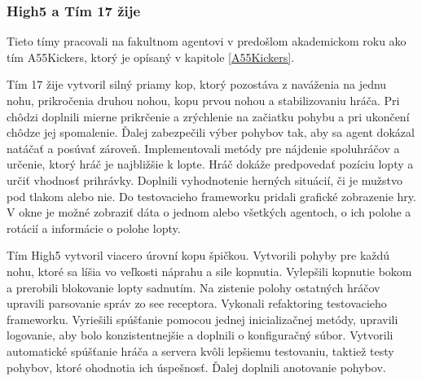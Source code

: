 \subsubsection{High5 a Tím 17 žije}

Tieto tímy pracovali na fakultnom agentovi v predošlom akademickom roku ako tím A55Kickers, ktorý je opísaný v kapitole \ref{A55Kickers}.

Tím 17 žije\cite{tim17zije} vytvoril silný priamy kop, ktorý pozostáva z naváženia na jednu nohu, prikročenia druhou nohou, kopu prvou nohou a stabilizovaniu hráča. Pri chôdzi doplnili mierne prikrčenie a zrýchlenie na začiatku pohybu a pri ukončení chôdze jej spomalenie. Ďalej zabezpečili výber pohybov tak, aby sa agent dokázal natáčať a posúvať zároveň. Implementovali metódy pre nájdenie spoluhráčov a určenie, ktorý hráč je najbližšie k lopte. Hráč dokáže predpovedať pozíciu lopty a určiť vhodnosť prihrávky. Doplnili vyhodnotenie herných situácií, či je mužstvo pod tlakom alebo nie. Do testovacieho frameworku pridali grafické zobrazenie hry. V okne je možné zobraziť dáta o jednom alebo všetkých agentoch, o ich polohe a rotácií a informácie o polohe lopty.

Tím High5\cite{high5} vytvoril viacero úrovní kopu špičkou. Vytvorili pohyby pre každú nohu, ktoré sa líšia vo veľkosti náprahu a sile kopnutia. Vylepšili kopnutie bokom a prerobili blokovanie lopty sadnutím. Na zistenie polohy ostatných hráčov upravili parsovanie správ zo see receptora. Vykonali refaktoring testovacieho frameworku. Vyriešili spúšťanie pomocou jednej inicializačnej metódy, upravili logovanie, aby bolo konzistentnejšie a doplnili o konfiguračný súbor. Vytvorili automatické spúšťanie hráča a servera kvôli lepšiemu testovaniu, taktiež testy pohybov, ktoré ohodnotia ich úspešnosť. Ďalej doplnili anotovanie pohybov.